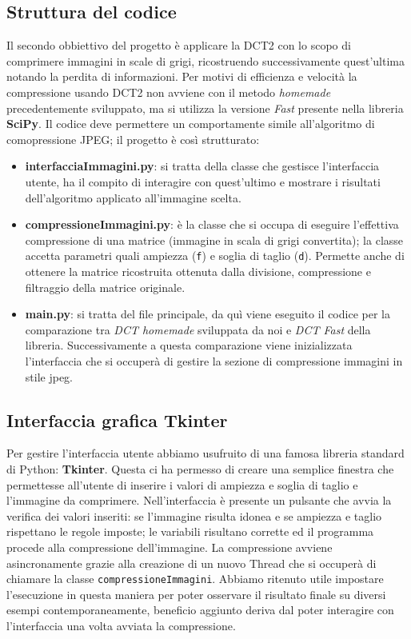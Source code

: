\subsection{Struttura del codice}
Il secondo obbiettivo del progetto è applicare la DCT2 con lo scopo di comprimere immagini in scale di grigi, ricostruendo successivamente quest'ultima notando la perdita di informazioni.
Per motivi di efficienza e velocità la compressione usando DCT2 non avviene con il metodo \textit{homemade} precedentemente sviluppato, ma si utilizza la versione \textit{Fast} presente nella libreria \textbf{SciPy}.
Il codice deve permettere un comportamente simile all'algoritmo di comopressione JPEG; il progetto è così strutturato:
\begin{itemize}
	\item \textbf{interfacciaImmagini.py}: si tratta della classe che gestisce l'interfaccia utente, ha il compito di interagire con quest'ultimo e mostrare i risultati dell'algoritmo applicato all'immagine scelta.
	\item \textbf{compressioneImmagini.py}: è la classe che si occupa di eseguire l'effettiva compressione di una matrice (immagine in scala di grigi convertita); la classe accetta parametri quali ampiezza (\texttt{f}) e soglia di taglio (\texttt{d}). Permette anche di ottenere la matrice ricostruita ottenuta dalla divisione, compressione e filtraggio della matrice originale.
	\item \textbf{main.py}: si tratta del file principale, da quì viene eseguito il codice per la comparazione tra \textit{DCT homemade} sviluppata da noi e \textit{DCT Fast} della libreria. Successivamente a questa comparazione viene inizializzata l'interfaccia che si occuperà di gestire la sezione di compressione immagini in stile jpeg.
\end{itemize} 

\subsection{Interfaccia grafica Tkinter}
Per gestire l'interfaccia utente abbiamo usufruito di una famosa libreria standard di Python: \textbf{Tkinter}.
Questa ci ha permesso di creare una semplice finestra che permettesse all'utente di inserire i valori di ampiezza e soglia di taglio e l'immagine da comprimere.
Nell'interfaccia è presente un pulsante che avvia la verifica dei valori inseriti: se l'immagine risulta idonea e se ampiezza e taglio rispettano le regole imposte; le variabili risultano corrette ed il programma procede alla compressione dell'immagine.
La compressione avviene asincronamente grazie alla creazione di un nuovo Thread che si occuperà di chiamare la classe \texttt{compressioneImmagini}.
Abbiamo ritenuto utile impostare l'esecuzione in questa maniera per poter osservare il risultato finale su diversi esempi contemporaneamente, beneficio aggiunto deriva dal poter interagire con l'interfaccia una volta avviata la compressione.

